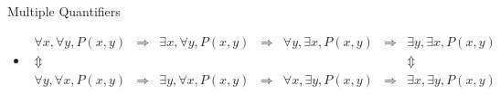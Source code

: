 \documentclass[10pt,english]{beamer}
\begin{document}
\begin{frame}{Multiple Quantifiers}
\begin{itemize}
\vspace{-7mm}
 \item<3->[] {\small \color{blue} \[ \!\!\!\!\!\!\!\!\!\!\!\!\!\!\!\!\!\!\! \begin{array}{ccccccc}
   \forall x, \forall y, P(x,y) & \Rightarrow & \exists x, \forall y, P(x,y) & \Rightarrow & \forall y, \exists x, P(x,y) & \Rightarrow & \exists y, \exists x, P(x,y) \\
   \Updownarrow &&&&&& \Updownarrow \\
   \forall y, \forall x, P(x,y) & \Rightarrow & \exists y, \forall x, P(x,y) & \Rightarrow & \forall x, \exists y, P(x,y) & \Rightarrow & \exists x, \exists y, P(x,y)
   \end{array} \]}

\end{itemize}



%

\end{frame}
\end{document}

